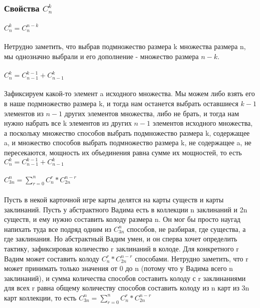 \subsubsection{Свойства $C_n^k$}
\paragraph{$C_n^k = C_n^{n - k}$}
$\;$ \\ Нетрудно заметить, что выбрав подмножество размера k множества размера n, мы однозначно выбрали и его дополнение - множество размера $n - k$.\\
\paragraph{$C_n^k = C_{n - 1}^{k - 1} + C_{n - 1}^k$}
$\;$ \\ Зафиксируем какой-то элемент a исходного множества. Мы можем либо взять его в наше подмножество размера k, и тогда нам останется выбрать оставшиеся $k - 1$ элементов из $n - 1$ других элементов множества, либо не брать, и тогда нам нужно набрать все k элементов из других $n - 1$ элементов исходного множества, а поскольку множество способов выбрать подмножество размера k, содержащее a, и множество способов выбрать подмножество размера k, не содержащее a, не пересекаются, мощность их объединения равна сумме их мощностей, то есть $C_n^k = C_{n - 1}^{k - 1} + C_{n - 1}^k$\\
\paragraph{$C_{3n}^{n} = \sum\limits_{r = 0}^{n} C_n^r * C_{2n}^{n - r}$}
$\;$ \\ Пусть в некой карточной игре карты делятся на карты существ и карты заклинаний. Пусть у абстрактного Вадима есть в коллекции n заклинаний и 2n существ, и ему нужно составить колоду размера n. Он мог бы просто наугад напихать туда все подряд одним из $C_{3n}^{n}$ способов, не разбирая, где существа, а где заклинания. Но абстрактный Вадим умен, и он сперва хочет определить тактику, зафиксировав количество r заклинаний в колоде. Для конкретного r Вадим может составить колоду $C_n^r * C_{2n}^{n - r}$ способами. Нетрудно заметить, что r может принимать только значения от 0 до n (потому что у Вадима всего n заклинаний), и сумма количества способов составить колоду с r заклинаниями для всех r равна общему количеству способов составить колоду из n карт из 3n карт коллекции, то есть $C_{3n}^{n} = \sum\limits_{r = 0}^{n} C_n^r * C_{2n}^{n - r}$
